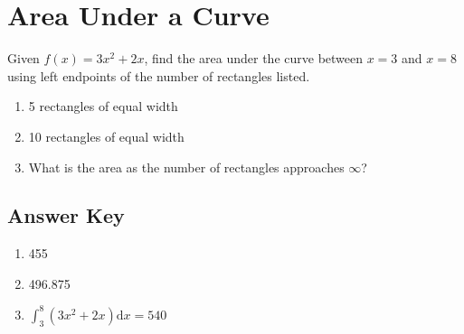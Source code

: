 \chapter{Area Under a Curve}

Given $f(x) = 3x^2+2x$, find the area under the curve between $x = 3$ and $x = 8$ using left endpoints of the number of rectangles listed. 
\begin{multicols}{3}
\begin{enumerate}
    \item 5 rectangles of equal width
    \item 10 rectangles of equal width
    \item What is the area as the number of rectangles approaches $\infty$?
\end{enumerate} \setcounter{Review}{\value{enumi}}
\end{multicols}

\newpage 

\section{Answer Key}

\begin{enumerate}
    \item 455
    \item 496.875
    \item $\displaystyle \int_{3}^{8} \left(3x^2 + 2x\right) \mathrm{d}x = 540$
\end{enumerate}